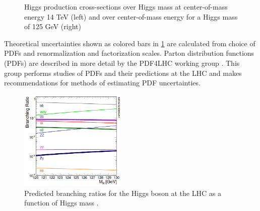 \begin{figure}[H]
    \centering
    \qquad
    \caption{Higgs production cross-sections over Higgs mass at center-of-mass energy 14 TeV (left) and over center-of-mass energy for a Higgs mass of 125 GeV  (right)\cite{LHCCrossSectionWG}}%
    \label{fig:HiggsCrosssection}%
\end{figure}

Theoretical uncertainties shown as colored bars in \ref{fig:HiggsCrosssection} are calculated from choice of PDFs and renormalization and factorization scales. Parton distribution functions (PDFs) are described in more detail by the PDF4LHC working group \cite{PDF4LHC}. This group performs studies of PDFs and their predictions at the LHC and makes recommendations for methods of estimating PDF uncertainties. 

\begin{figure}[H]
        \centering
    \includegraphics[width=0.45\textwidth] {Pictures/HiggsBranching.png}\hspace{1cm}
    \caption{Predicted branching ratios for the Higgs boson at the LHC as a function of Higgs mass \cite{LHCCrossSectionWG}.}
    \label{fig:HiggsBR}
\end{figure}

